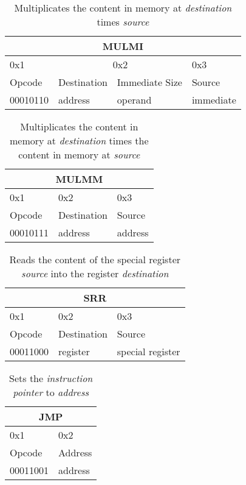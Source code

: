 \documentclass{article}
\begin{document}
\begin{table}[H]
  \centering
  \begin{tabular} { | p{2cm} | | p{2cm} | p{} | | p{2cm} |}
    \hline
    \multicolumn{4}{|c|}{MULMI}\\
    \hline
    0x1 & \multicolumn{2}{|c|}{0x2} & 0x3\\
    \hline
    Opcode & Destination & Immediate Size & Source\\
    00010110 & address & operand & immediate\\
    \hline
  \end{tabular}
  \caption{Multiplicates the content in memory at \textit{destination} times \textit{source}}
\end{table}

\begin{table}[H]
  \centering
  \begin{tabular} { | p{2cm} | | p{2cm} | p{2cm} |}
    \hline
    \multicolumn{3}{|c|}{MULMM}\\
    \hline
    0x1 & 0x2 & 0x3\\
    \hline
    Opcode & Destination & Source\\
    00010111 & address & address\\
    \hline
  \end{tabular}
  \caption{Multiplicates the content in memory at \textit{destination} times  the content in memory at \textit{source}}
\end{table}

\begin{table}[H]
  \centering
  \begin{tabular} { | p{2cm} | | p{2cm} | p{} |}
    \hline
    \multicolumn{3}{|c|}{SRR}\\
    \hline
    0x1 & 0x2 & 0x3\\
    \hline
    Opcode & Destination & Source\\
    00011000 & register & special register\\
    \hline
  \end{tabular}
  \caption{Reads the content of the special register \textit{source} into the register \textit{destination}}
\end{table}

\begin{table}[H]
  \centering
  \begin{tabular} { | p{2cm} | | p{2cm} |}
    \hline
    \multicolumn{2}{|c|}{JMP}\\
    \hline
    0x1 & 0x2\\
    \hline
    Opcode & Address\\
    00011001 & address\\
    \hline
  \end{tabular}
  \caption{Sets the \textit{instruction pointer} to \textit{address}}
\end{table}
\end{document}

